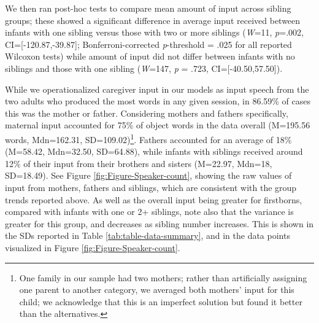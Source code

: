\documentclass[
  man,mask,floatsintext]{apa6}
\begin{document}
We then ran post-hoc tests to compare mean amount of input across sibling groups; these showed a significant difference in average input received between infants with one sibling versus those with two or more siblings (\emph{W}=11, \emph{p}=.002, CI={[}-120.87,-39.87{]}; Bonferroni-corrected \emph{p}-threshold = .025 for all reported Wilcoxon tests) while amount of input did not differ between infants with no siblings and those with one sibling (\emph{W}=147, \emph{p} = .723, CI={[}-40.50,57.50{]}).

While we operationalized caregiver input in our models as input speech from the two adults who produced the most words in any given session, in 86.59\% of cases this was the mother or father. Considering mothers and fathers specifically, maternal input accounted for 75\% of object words in the data overall (M=195.56 words, Mdn=162.31, SD=109.02)\footnote{One family in our sample had two mothers; rather than artificially assigning one parent to another category, we averaged both mothers' input for this child; we acknowledge that this is an imperfect solution but found it better than the alternatives.}. Fathers accounted for an average of 18\% (M=58.42, Mdn=32.50, SD=64.88), while infants with siblings received around 12\% of their input from their brothers and sisters (M=22.97, Mdn=18, SD=18.49). See Figure \ref{fig:Figure-Speaker-count}, showing the raw values of input from mothers, fathers and siblings, which are consistent with the group trends reported above. As well as the overall input being greater for firstborns, compared with infants with one or 2+ siblings, note also that the variance is greater for this group, and decreases as sibling number increases. This is shown in the SDs reported in Table \ref{tab:table-data-summary}, and in the data points visualized in Figure \ref{fig:Figure-Speaker-count}.
\end{document}

